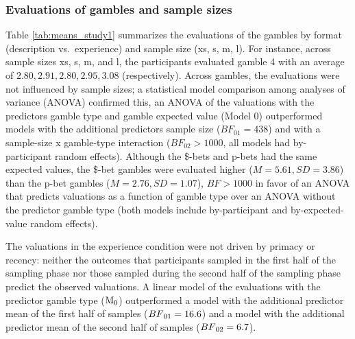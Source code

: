 \documentclass[
  a4paper, man, floatsintext]{apa6}
\author{Jana B. Jarecki}
\date{13 Mai, 2020}
\begin{document}
\subsubsection{Evaluations of gambles and sample sizes}

Table \ref{tab:means_study1} summarizes the evaluations of the gambles
by format (description vs.~experience) and sample size (xs, s, m, l).
For instance, across sample sizes xs, s, m, and l, the participants
evaluated gamble 4 with an average of \(2.80, 2.91, 2.80, 2.95, 3.08\)
(respectively). Across gambles, the evaluations were not influenced by
sample sizes; a statistical model comparison among analyses of variance
(ANOVA) confirmed this, an ANOVA of the valuations with the predictors
gamble type and gamble expected value (Model 0) outperformed models with
the additional predictors sample size (\(BF_{01} = 438\)) and with a
sample-size x gamble-type interaction (\(BF_{02} > 1000\), all models
had by-participant random effects). Although the \$-bets and p-bets had
the same expected values, the \$-bet gambles were evaluated higher
(\(M=5.61, SD=3.86\)) than the p-bet gambles (\(M=2.76, SD=1.07\)),
\(BF > 1000\) in favor of an ANOVA that predicts valuations as a
function of gamble type over an ANOVA without the predictor gamble type
(both models include by-participant and by-expected-value random
effects).

The valuations in the experience condition were not driven by primacy or
recency: neither the outcomes that participants sampled in the first
half of the sampling phase nor those sampled during the second half of
the sampling phase predict the observed valuations. A linear model of
the evaluations with the predictor gamble type
(\(\mathrm{M}\textsubscript{0}\)) outperformed a model with the
additional predictor mean of the first half of samples
(\(BF\textsubscript{01} = 16.6\)) and a model with the additional
predictor mean of the second half of samples
(\(BF\textsubscript{02} = 6.7\)).

\end{document}
